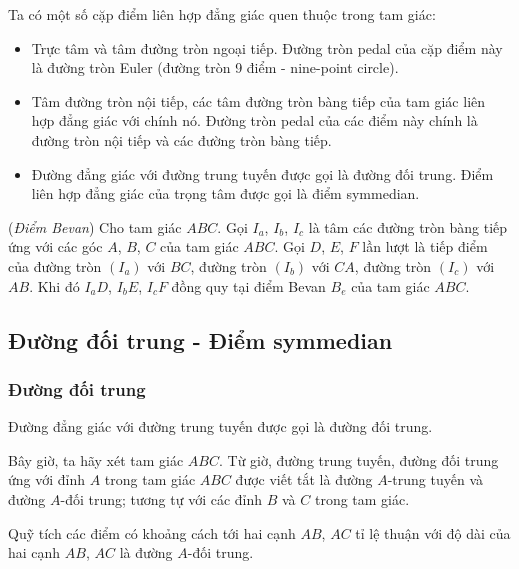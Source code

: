         Ta có một số cặp điểm liên hợp đẳng giác quen thuộc trong tam giác:
        \begin{itemize}
            \item Trực tâm và tâm đường tròn ngoại tiếp. Đường tròn pedal của cặp điểm này là đường tròn Euler (đường tròn 9 điểm - nine-point circle).
            \item Tâm đường tròn nội tiếp, các tâm đường tròn bàng tiếp của tam giác liên hợp đẳng giác với chính nó. Đường tròn pedal của các điểm này chính là đường tròn nội tiếp và các đường tròn bàng tiếp.
            \item Đường đẳng giác với đường trung tuyến được gọi là đường đối trung. Điểm liên hợp đẳng giác của trọng tâm được gọi là điểm symmedian.
        \end{itemize}

        \begin{corollary}
            (\textit{Điểm Bevan}) Cho tam giác \(ABC\). Gọi \(I_a\), \(I_b\), \(I_c\) là tâm các đường tròn bàng tiếp ứng với các góc \(A\), \(B\), \(C\) của tam giác \(ABC\). Gọi \(D\), \(E\), \(F\) lần lượt là tiếp điểm của đường tròn \((I_a)\) với \(BC\), đường tròn \((I_b)\) với \(CA\), đường tròn \((I_c)\) với \(AB\). Khi đó \(I_aD\), \(I_bE\), \(I_cF\) đồng quy tại điểm Bevan \(B_e\) của tam giác \(ABC\).
        \end{corollary}

    \subsection{Đường đối trung - Điểm symmedian}

    \subsubsection*{Đường đối trung}

        \begin{definition}
            Đường đẳng giác với đường trung tuyến được gọi là đường đối trung.
        \end{definition}

        Bây giờ, ta hãy xét tam giác \(ABC\). Từ giờ, đường trung tuyến, đường đối trung ứng với đỉnh \(A\) trong tam giác \(ABC\) được viết tắt là đường \(A\)-trung tuyến và đường \(A\)-đối trung; tương tự với các đỉnh \(B\) và \(C\) trong tam giác.

        \begin{property}
            Quỹ tích các điểm có khoảng cách tới hai cạnh \(AB\), \(AC\) tỉ lệ thuận với độ dài của hai cạnh \(AB\), \(AC\) là đường \(A\)-đối trung.
        \end{property}

